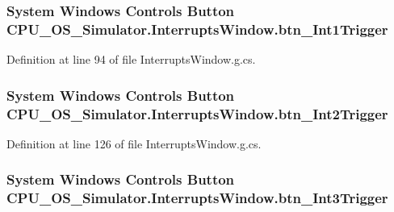 \subsubsection[{btn\+\_\+\+Int1\+Trigger}]{\setlength{\rightskip}{0pt plus 5cm}System Windows Controls Button C\+P\+U\+\_\+\+O\+S\+\_\+\+Simulator.\+Interrupts\+Window.\+btn\+\_\+\+Int1\+Trigger\hspace{0.3cm}{\ttfamily [package]}}\label{class_c_p_u___o_s___simulator_1_1_interrupts_window_aa07297ac7d16c66b42c2b390e7fca08e}


Definition at line 94 of file Interrupts\+Window.\+g.\+cs.

\hypertarget{class_c_p_u___o_s___simulator_1_1_interrupts_window_a712728d9db84caf19171bb4390f2cfb0}{}
\subsubsection[{btn\+\_\+\+Int2\+Trigger}]{\setlength{\rightskip}{0pt plus 5cm}System Windows Controls Button C\+P\+U\+\_\+\+O\+S\+\_\+\+Simulator.\+Interrupts\+Window.\+btn\+\_\+\+Int2\+Trigger\hspace{0.3cm}{\ttfamily [package]}}\label{class_c_p_u___o_s___simulator_1_1_interrupts_window_a712728d9db84caf19171bb4390f2cfb0}


Definition at line 126 of file Interrupts\+Window.\+g.\+cs.

\hypertarget{class_c_p_u___o_s___simulator_1_1_interrupts_window_ab697388b33fac73a4044fd6a3877e286}{}
\subsubsection[{btn\+\_\+\+Int3\+Trigger}]{\setlength{\rightskip}{0pt plus 5cm}System Windows Controls Button C\+P\+U\+\_\+\+O\+S\+\_\+\+Simulator.\+Interrupts\+Window.\+btn\+\_\+\+Int3\+Trigger\hspace{0.3cm}{\ttfamily [package]}}\label{class_c_p_u___o_s___simulator_1_1_interrupts_window_ab697388b33fac73a4044fd6a3877e286}


